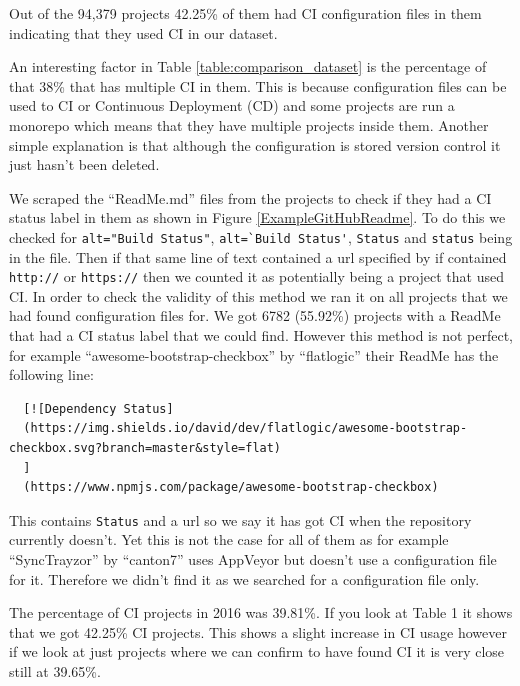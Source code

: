 \documentclass[10pt,conference]{IEEEtran}
\begin{document}
Out of the 94,379 projects 42.25\% of them had CI configuration files in them indicating that they used CI in our dataset. 


An interesting factor in Table \ref{table:comparison_dataset} is the percentage of that 38\% that has multiple CI in them. This is because configuration files can be used to CI or Continuous Deployment (CD) and some projects are run a monorepo which means that they have multiple projects inside them. Another simple explanation is that although the configuration is stored version control it just hasn't been deleted. 

We scraped the \enquote{ReadMe.md} files from the projects to check if they had a CI status label in them as shown in Figure \ref{ExampleGitHubReadme}. To do this we checked for \verb|alt="Build Status"|, \verb|alt=`Build Status'|, \verb|Status| and \verb|status| being in the file. Then if that same line of text contained a url specified by if contained \verb|http://| or \verb|https://| then we counted it as potentially being a project that used CI. In order to check the validity of this method we ran it on all projects that we had found configuration files for. We got 6782 (55.92\%) projects with a ReadMe that had a CI status label that we could find. 
However this method is not perfect, for example \enquote{awesome-bootstrap-checkbox} by \enquote{flatlogic} \cite{GithubReadMeIncorrectFind} their ReadMe has the following line:
\begin{verbatim}
  [![Dependency Status]
  (https://img.shields.io/david/dev/flatlogic/awesome-bootstrap-checkbox.svg?branch=master&style=flat)
  ]
  (https://www.npmjs.com/package/awesome-bootstrap-checkbox) 
\end{verbatim}
This contains \verb|Status| and a url so we say it has got CI when the repository currently doesn't. Yet this is not the case for all of them as for example \enquote{SyncTrayzor} by \enquote{canton7} \cite{Male2020} uses AppVeyor but doesn't use a configuration file for it. Therefore we didn't find it as we searched for a configuration file only. 

The percentage of CI projects in 2016 was 39.81\%. If you look at Table 1 it shows that we got 42.25\% CI projects. This shows a slight increase in CI usage however if we look at just projects where we can confirm to have found CI it is very close still at 39.65\%. 
\end{document}
